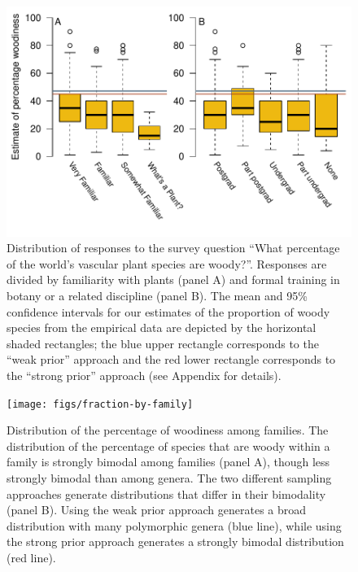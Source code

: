 \documentclass[a4paper,12pt]{article}
\begin{document}
\begin{figure}[p]
  \centering
  \includegraphics{figs/survey-results}
  \caption{Distribution of responses to the survey question ``What
    percentage of the world's vascular plant species are
    woody?''. Responses are divided by familiarity with plants
    (panel A) and formal training in botany or a related discipline
    (panel B). The mean and 95\% confidence intervals for our
    estimates of the proportion of woody species from the empirical
    data are depicted by the horizontal shaded rectangles; the blue
    upper rectangle corresponds to the ``weak prior'' approach and the
    red lower rectangle corresponds to the ``strong prior'' approach
    (see Appendix for details).}
  \label{fig:survey}
\end{figure}

\clearpage
\renewcommand\thefigure{S.\arabic{figure}}
\renewcommand\thetable{S.\arabic{table}}
\setcounter{figure}{0}    
\setcounter{table}{0}

\begin{figure}[p]
  \centering
  \texttt{[image: figs/fraction-by-family]}
  \caption{Distribution of the percentage of woodiness among families.
    The distribution of the percentage of species that are woody within
    a family is strongly bimodal among families (panel A), though less
    strongly bimodal than among genera.
    The two different sampling approaches generate distributions that
    differ in their bimodality (panel B).  Using the weak prior
    approach generates a broad distribution with many polymorphic
    genera (blue line), while using the strong prior approach
    generates a strongly bimodal distribution (red line).}
  \label{fig:distribution-family}
\end{figure}
\end{document}
